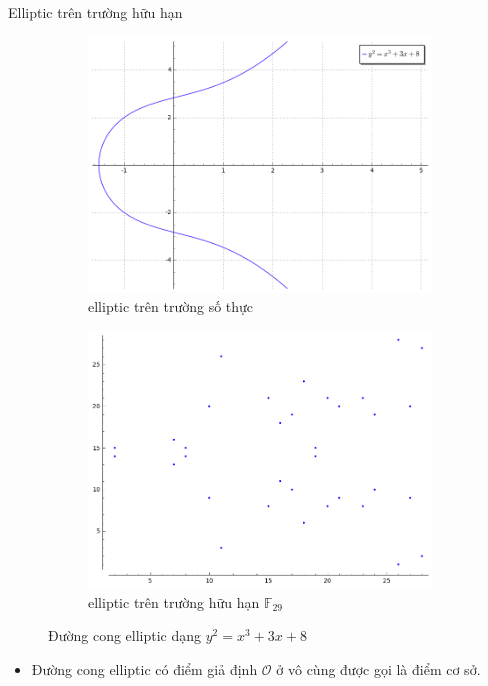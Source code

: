\documentclass[compress]{beamer}
\begin{document}
\begin{frame}{Elliptic trên trường hữu hạn}
\begin{figure}[h]
\begin{subfigure}{.5\textwidth}
  \centering
  \includegraphics[width=1\linewidth]{../im11.png}
  \caption{elliptic trên trường số thực}
  \label{fig:sfig1}
\end{subfigure}%
\begin{subfigure}{.5\textwidth}
  \centering
  \includegraphics[width=1\linewidth]{../im12.png}
  \caption{elliptic trên trường hữu hạn $\mathbb{F}_{29}$}
  \label{fig:sfig2}
\end{subfigure}
\caption*{Đường cong elliptic dạng $y^2 = x^3 + 3x + 8$}
\label{fig:fig}
\end{figure}
\begin{itemize}
\item Đường cong elliptic có điểm giả định $\mathcal{O}$ ở vô cùng được gọi là điểm cơ sở.
\end{itemize}
\end{frame}
\end{document}
